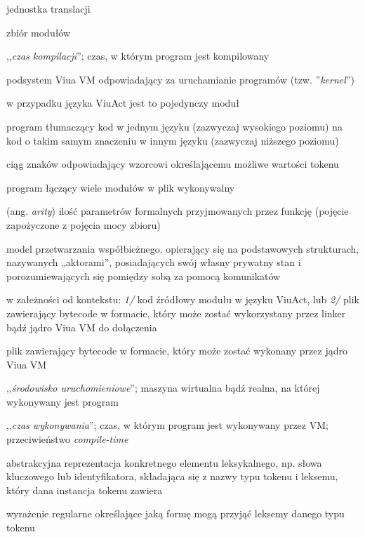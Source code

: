\begin{labeling}{jednostka translacji}
    \item[biblioteka] zbiór modułów
    \item[\emph{compile-time}] ,,\emph{czas kompilacji}''; czas, w którym program jest kompilowany
    \item[jądro] podsystem Viua VM odpowiadający za uruchamianie programów (tzw. ''\emph{kernel}'')
    \item[jednostka translacji] w przypadku języka ViuAct jest to pojedynczy moduł
    \item[kompilator] program tłumaczący kod w jednym języku (zazwyczaj wysokiego poziomu) na kod o takim
        samym znaczeniu w innym języku (zazwyczaj niższego poziomu)
    \item[leksem] ciąg znaków odpowiadający wzorcowi określającemu możliwe wartości tokenu
    \item[linker] program łączący wiele modułów w plik wykonywalny
    \item[moc funkcji] (ang. \emph{arity}) ilość parametrów formalnych przyjmowanych przez funkcję (pojęcie
        zapożyczone z pojęcia mocy zbioru)
    \item [model aktorów] model przetwarzania współbieżnego, opierający się na
        podstawowych strukturach, nazywanych „aktorami”, posiadających swój
        własny prywatny stan i porozumiewających się pomiędzy sobą za pomocą
        komunikatów
    \item[moduł] w załeżności od kontekstu: \emph{1/} kod źródłowy modułu w języku ViuAct, lub \emph{2/} plik
        zawierający bytecode w formacie, który może zostać wykorzystany przez linker bądź jądro Viua VM do
        dołączenia
    \item[plik wykonywalny] plik zawierający bytecode w formacie, który może zostać wykonany przez jądro Viua
        VM
    \item[runtime] ,,\emph{środowisko uruchomieniowe}''; maszyna wirtualna bądź realna, na której
        wykonywany jest program
    \item[\emph{run-time}] ,,\emph{czas wykonywania}''; czas, w którym program jest wykonywany przez VM;
        przeciwieństwo \emph{compile-time}
    \item[token] abstrakcyjna reprezentacja konkretnego elementu leksykalnego, np. słowa kluczowego lub
        identyfikatora, składająca się z nazwy typu tokenu i leksemu, który dana instancja tokenu zawiera
    \item[wzorzec] wyrażenie regularne określające jaką formę mogą przyjąć leksemy danego typu tokenu
\end{labeling}

